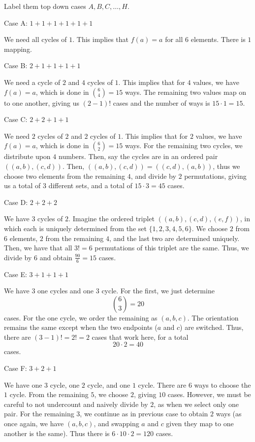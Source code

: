 \begin{enumerate}
 Label them top down cases \( A, B, C, \dots, H \). 

 Case A: \( 1+1+1+1+1+1 \)

 We need all cycles of \( 1 \). This implies that \( f(a)=a \) for all \( 6 \) elements. There is \( 1 \) mapping.

 Case B: \( 2+1+1+1+1 \)

 We need a cycle of \( 2 \) and \( 4 \) cycles of \( 1 \). This implies that for \( 4 \) values, we have \( f(a)=a \), which is done in $\binom{6}{4} = 15$ ways. The remaining two values map on to one another, giving us \( (2-1)! \) cases and the number of ways is $15 \cdot 1 = 15$.

 Case C: \( 2+2+1+1 \)

 We need \( 2 \) cycles of \( 2 \) and \( 2 \) cycles of \( 1 \). This implies that for \( 2 \) values, we have \( f(a)=a \), which is done in $\binom{6}{2} = 15$ ways. For the remaining two cycles, we distribute upon \( 4 \) numbers. Then, say the cycles are in an ordered pair \( ((a,b),(c,d)) \). Then, \( ((a,b),(c,d)) = ((c,d),(a,b)) \), thus we choose two elements from the remaining \( 4 \), and divide by \( 2 \) permutations, giving us a total of \( 3 \) different sets, and a total of $15 \cdot 3 = 45$ cases.

 Case D: \( 2+2+2 \)

 We have \( 3 \) cycles of \( 2 \). Imagine the ordered triplet \( ((a,b),(c,d),(e,f)) \), in which each is uniquely determined from the set \( \{1, 2, 3, 4, 5, 6\} \). We choose \( 2 \) from \( 6 \) elements, \( 2 \) from the remaining \( 4 \), and the last two are determined uniquely. Then, we have that all \( 3! = 6 \) permutations of this triplet are the same. Thus, we divide by \( 6 \) and obtain $\frac{90}{6} = 15$ cases.

 Case E: \( 3+1+1+1 \)

 We have \( 3 \) one cycles and one \( 3 \) cycle. For the first, we just determine 
 \[\binom{6}{3} = 20\] cases. For the one cycle, we order the remaining as \( (a,b,c) \). The orientation remains the same except when the two endpoints (\( a \) and \( c \)) are switched. Thus, there are \( (3-1)! = 2! = 2 \) cases that work here, for a total 
 \[20 \cdot 2 = 40\] cases.

 Case F: \( 3+2+1 \)

 We have one \( 3 \) cycle, one \( 2 \) cycle, and one \( 1 \) cycle. There are \( 6 \) ways to choose the \( 1 \) cycle. From the remaining \( 5 \), we choose \( 2 \), giving \( 10 \) cases. However, we must be careful to not undercount and naively divide by \( 2 \), as when we select only one pair. For the remaining \( 3 \), we continue as in previous case to obtain \( 2 \) ways (as once again, we have \( (a,b,c) \), and swapping \( a \) and \( c \) given they map to one another is the same). Thus there is $6 \cdot 10 \cdot 2 = 120$ cases.


\end{enumerate}
